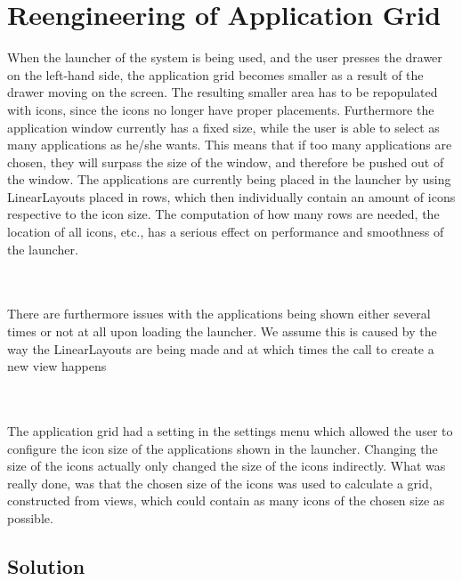 
\section{Reengineering of Application Grid}
\label{sec:reengineering_of_application_grid}

When the launcher of the \giraf system is being used, and the user presses the drawer on the left-hand side, the application grid becomes smaller as a result of the drawer moving on the screen. The resulting smaller area has to be repopulated with icons, since the icons no longer have proper placements. Furthermore the application window currently has a fixed size, while the user is able to select as many applications as he/she wants. This means that if too many applications are chosen, they will surpass the size of the window, and therefore be pushed out of the window.
The applications are currently being placed in the launcher by using LinearLayouts placed in rows, which then individually contain an amount of icons respective to the icon size. The computation of how many rows are needed, the location of all icons, etc., has a serious effect on performance and smoothness of the launcher. 


\\\\
There are furthermore issues with the applications being shown either several times or not at all upon loading the launcher. We assume this is caused by the way the LinearLayouts are being made and at which times the call to create a new view happens



\\\\
The application grid had a setting in the settings menu which allowed the user to configure the icon size of the applications shown in the launcher. Changing the size of the icons actually only changed the size of the icons indirectly. What was really done, was that the chosen size of the icons was used to calculate a grid, constructed from  views, which could contain as many icons of the chosen size as possible. 

\subsection{Solution}
\label{sub:reengineering_of_application_grid_solution}

